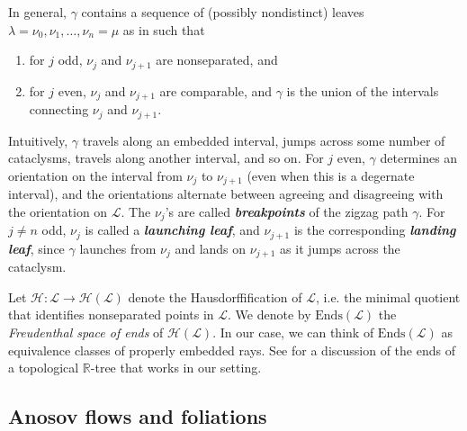 \documentclass[11pt]{amsart}
\newcommand{\R}{\mathbb{R}}
\renewcommand{\l}{\lambda}
\newcommand{\mc}{\mathcal}
\newcommand{\defn}[1]{\textbf{\emph{#1}}}
\newcommand{\Ends}{\mathrm{Ends}}
\numberwithin{equation}{section}
\theoremstyle{definition}
\begin{document}
In general, $\gamma$ contains a sequence of (possibly nondistinct) leaves $\l=\nu_0,\nu_1,\ldots,\nu_n=\mu$ as in  such that 
\begin{enumerate}
	\item for $j$ odd, $\nu_j$ and $\nu_{j+1}$ are nonseparated, and
	\item for $j$ even, $\nu_j$ and $\nu_{j+1}$ are comparable, and $\gamma$ is the union of the intervals connecting $\nu_j$ and $\nu_{j+1}$.
\end{enumerate}
Intuitively, $\gamma$ travels along an embedded interval, jumps across some number of cataclysms, travels along another interval, and so on. For $j$ even, $\gamma$ determines an orientation on the interval from $\nu_j$ to $\nu_{j+1}$ (even when this is a degernate interval), and the orientations alternate between agreeing and disagreeing with the orientation on $\mc L$. The $\nu_j$'s are called \defn{breakpoints} of the zigzag path $\gamma$. For $j\neq n$ odd, $\nu_j$ is called a \defn{launching leaf}, and $\nu_{j+1}$ is the corresponding \defn{landing leaf}, since $\gamma$ launches from $\nu_j$ and lands on $\nu_{j+1}$ as it jumps across the cataclysm.


Let $\mc H\colon\mc L\to\mc H(\mc L)$ denote the Hausdorffification of $\mc L$, i.e. the minimal quotient that identifies nonseparated points in $\mc L$. We denote by $\Ends(\mc L)$ the \emph{Freudenthal space of ends} of $\mc H(\mc L)$. In our case, we can think of $\Ends(\mc L)$ as equivalence classes of properly embedded rays. See \cite[Section 2.2]{calegari2024zippers} for a discussion of the ends of a topological $\R$-tree that works in our setting.

\subsection{Anosov flows and foliations}\label{sec:anosov_background}
\end{document}
